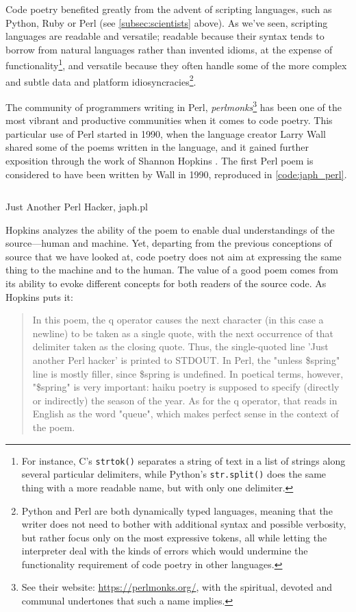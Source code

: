 Code poetry benefited greatly from the advent of scripting languages, such as Python, Ruby or Perl (see \ref{subsec:scientists} above). As we've seen, scripting languages are readable and versatile; readable because their syntax tends to borrow from natural languages rather than invented idioms, at the expense of functionality\footnote{For instance, C's \lstinline{strtok()} separates a string of text in a list of strings along several particular delimiters, while Python's \lstinline{str.split()} does the same thing with a more readable name, but with only one delimiter.}, and versatile because they often handle some of the more complex and subtle data and platform idiosyncracies\footnote{Python and Perl are both dynamically typed languages, meaning that the writer does not need to bother with additional syntax and possible verbosity, but rather focus only on the most expressive tokens, all while letting the interpreter deal with the kinds of errors which would undermine the functionality requirement of code poetry in other languages.}.

The community of programmers writing in Perl, \emph{perlmonks}\footnote{See their website: \url{https://perlmonks.org/}, with the spiritual, devoted and communal undertones that such a name implies.} has been one of the most vibrant and productive communities when it comes to code poetry. This particular use of Perl started in 1990, when the language creator Larry Wall shared some of the poems written in the language, and it gained further exposition through the work of Shannon Hopkins \citep{hopkins_camels_1992}. The first Perl poem is considered to have been written by Wall in 1990, reproduced in \ref{code:japh_perl}.

\begin{listing}
  \inputminted{perl}{./corpus/japh.pl}
  \caption{Just Another Perl Hacker, japh.pl}
  \label{code:japh_perl}
\end{listing}

Hopkins analyzes the ability of the poem to enable dual understandings of the source—human and machine. Yet, departing from the previous conceptions of source that we have looked at, code poetry does not aim at expressing the same thing to the machine and to the human. The value of a good poem comes from its ability to evoke different concepts for both readers of the source code. As Hopkins puts it:

\begin{quote}
  In this poem, the q operator causes the next character (in this case a newline) to be taken as a single quote, with the next occurrence of that delimiter taken as the closing quote. Thus, the single-quoted line 'Just another Perl hacker' is printed to STDOUT. In Perl, the "unless \$spring" line is mostly filler, since \$spring is undefined. In poetical terms, however, "\$spring" is very important: haiku poetry is supposed to specify (directly or indirectly) the season of the year. As for the q operator, that reads in English as the word "queue", which makes perfect sense in the context of the poem. \citep{hopkins_camels_1992}
\end{quote}

